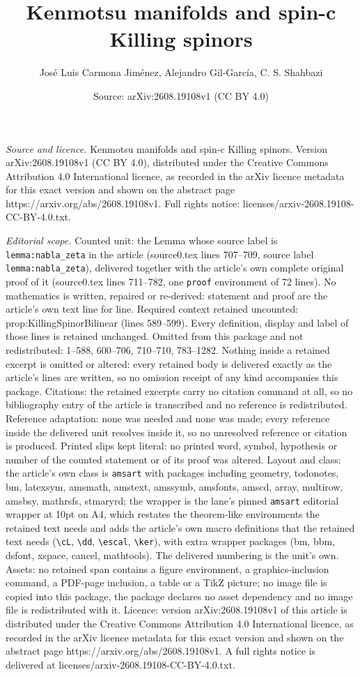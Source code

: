 \documentclass[10pt,a4paper]{amsart}
\title[Kenmotsu manifolds and spin-c Killing spinors]{Kenmotsu manifolds and spin-c Killing spinors}
\author{Jos\'e Luis Carmona Jim\'enez, Alejandro Gil-Garc\'ia, C. S. Shahbazi}
\date{Source: arXiv:2608.19108v1 (CC BY 4.0)}
\begin{document}
\maketitle

\noindent\emph{Source and licence.} Kenmotsu manifolds and spin-c Killing spinors. Version arXiv:2608.19108v1 (CC BY 4.0), distributed under the Creative Commons Attribution 4.0 International licence, as recorded in the arXiv licence metadata for this exact version and shown on the abstract page https://arxiv.org/abs/2608.19108v1. Full rights notice: licenses/arxiv-2608.19108-CC-BY-4.0.txt.\par\smallskip

\noindent\textit{Editorial scope.} Counted unit: the Lemma whose source label is \texttt{lemma:nabla\_zeta} in the article (source0.tex lines 707--709, source label \texttt{lemma:nabla\_zeta}), delivered together with the article's own complete original proof of it (source0.tex lines 711--782, one \texttt{proof} environment of 72 lines). No mathematics is written, repaired or re-derived: statement and proof are the article's own text line for line. Required context retained uncounted: prop:KillingSpinorBilinear (lines 589--599). Every definition, display and label of those lines is retained unchanged. Omitted from this package and not redistributed: 1--588, 600--706, 710--710, 783--1282. Nothing inside a retained excerpt is omitted or altered: every retained body is delivered exactly as the article's lines are written, so no omission receipt of any kind accompanies this package. Citations: the retained excerpts carry no citation command at all, so no bibliography entry of the article is transcribed and no reference is redistributed. Reference adaptation: none was needed and none was made; every reference inside the delivered unit resolves inside it, so no unresolved reference or citation is produced. Printed slips kept literal: no printed word, symbol, hypothesis or number of the counted statement or of its proof was altered. Layout and class: the article's own class is \texttt{amsart} with packages including geometry, todonotes, bm, latexsym, amsmath, amstext, amssymb, amsfonts, amscd, array, multirow, amsbsy, mathrsfs, stmaryrd; the wrapper is the lane's pinned \texttt{amsart} editorial wrapper at 10pt on A4, which restates the theorem-like environments the retained text needs and adds the article's own macro definitions that the retained text needs (\texttt{\textbackslash cL}, \texttt{\textbackslash dd}, \texttt{\textbackslash escal}, \texttt{\textbackslash ker}), with extra wrapper packages (bm, bbm, dsfont, xspace, cancel, mathtools). The delivered numbering is the unit's own. Assets: no retained span contains a figure environment, a graphics-inclusion command, a PDF-page inclusion, a table or a TikZ picture; no image file is copied into this package, the package declares no asset dependency and no image file is redistributed with it. Licence: version arXiv:2608.19108v1 of this article is distributed under the Creative Commons Attribution 4.0 International licence, as recorded in the arXiv licence metadata for this exact version and shown on the abstract page https://arxiv.org/abs/2608.19108v1. A full rights notice is delivered at licenses/arxiv-2608.19108-CC-BY-4.0.txt. 
\end{document}
